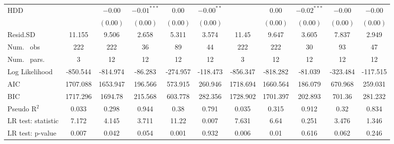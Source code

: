 \begin{table}
\begin{center}
\begin{tabular}{l c c c c c c c c c c}
HDD                               &               & $-0.00$       & $-0.01^{***}$ & $0.00$        & $-0.00^{**}$   &               & $0.00$        & $-0.02^{***}$ & $-0.00$       & $-0.00$        \\
                                  &               & $(0.00)$      & $(0.00)$      & $(0.00)$      & $(0.00)$       &               & $(0.00)$      & $(0.00)$      & $(0.00)$      & $(0.00)$       \\
\hline
Resid.SD                          & 11.155        & 9.506         & 2.658         & 5.311         & 3.574          & 11.45         & 9.647         & 3.605         & 7.837         & 2.949          \\
Num. \ obs                        & 222           & 222           & 36            & 89            & 44             & 222           & 222           & 30            & 93            & 47             \\
Num. \ pars.                      & 3             & 12            & 12            & 12            & 12             & 3             & 12            & 12            & 12            & 12             \\
Log Likelihood                    & -850.544      & -814.974      & -86.283       & -274.957      & -118.473       & -856.347      & -818.282      & -81.039       & -323.484      & -117.515       \\
AIC                               & 1707.088      & 1653.947      & 196.566       & 573.915       & 260.946        & 1718.694      & 1660.564      & 186.079       & 670.968       & 259.031        \\
BIC                               & 1717.296      & 1694.78       & 215.568       & 603.778       & 282.356        & 1728.902      & 1701.397      & 202.893       & 701.36        & 281.232        \\
Pseudo R$^2$                      & 0.033         & 0.298         & 0.944         & 0.38          & 0.791          & 0.035         & 0.315         & 0.912         & 0.32          & 0.834          \\
LR test: statistic                & 7.172         & 4.145         & 3.711         & 11.22         & 0.007          & 7.631         & 6.64          & 0.251         & 3.476         & 1.346          \\
LR test: p-value                  & 0.007         & 0.042         & 0.054         & 0.001         & 0.932          & 0.006         & 0.01          & 0.616         & 0.062         & 0.246          \\

\end{tabular}
\end{center}
\end{table}
